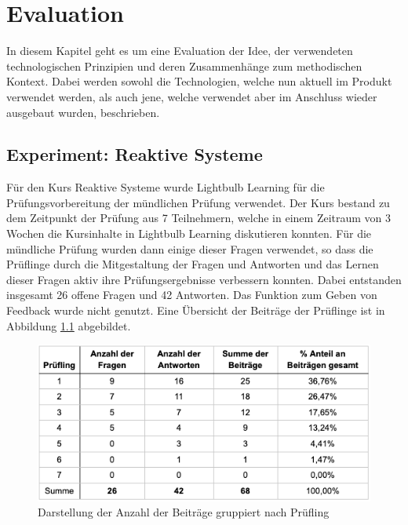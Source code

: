 \chapter{Evaluation}
\label{chap:eval}
In diesem Kapitel geht es um eine Evaluation der Idee, der verwendeten technologischen Prinzipien und deren Zusammenhänge zum methodischen Kontext. Dabei werden sowohl die Technologien, welche nun aktuell im Produkt verwendet werden, als auch jene, welche verwendet aber im Anschluss wieder ausgebaut wurden, beschrieben.

\section{Experiment: Reaktive Systeme}
Für den Kurs Reaktive Systeme wurde Lightbulb Learning für die Prüfungsvorbereitung der mündlichen Prüfung verwendet. Der Kurs bestand zu dem Zeitpunkt der Prüfung aus 7 Teilnehmern, welche in einem Zeitraum von 3 Wochen die Kursinhalte in Lightbulb Learning diskutieren konnten. Für die mündliche Prüfung wurden dann einige dieser Fragen verwendet, so dass die Prüflinge durch die Mitgestaltung der Fragen und Antworten und das Lernen dieser Fragen aktiv ihre Prüfungsergebnisse verbessern konnten. Dabei entstanden insgesamt 26 offene Fragen und 42 Antworten. Das Funktion zum Geben von Feedback wurde nicht genutzt. Eine Übersicht der Beiträge der Prüflinge ist in Abbildung \ref{fig:table} abgebildet.
\begin{figure}[H]
    \centering
    \includegraphics[width = .9\textwidth]{images/exrs.png}
    \caption{Darstellung der Anzahl der Beiträge gruppiert nach Prüfling}
    \label{fig:table}
\end{figure}
